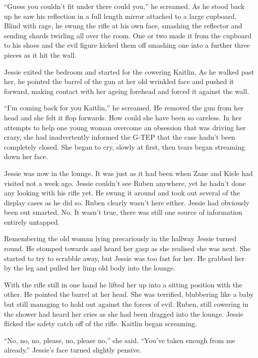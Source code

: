 ``Guess you couldn't fit under there could you,'' he screamed.  As he stood back up he saw his reflection in a full length mirror attached to a large cupboard.  Blind with rage, he swung the rifle at his own face, smashing the reflector and sending shards twirling all over the room.  One or two made it from the cupboard to his shoes and the evil figure kicked them off smashing one into a further three pieces as it hit the wall.

Jessie exited the bedroom and started for the cowering Kaitlin.  As he walked past her, he pointed the barrel of the gun at her old wrinkled face and pushed it forward, making contact with her ageing forehead and forced it against the wall.

``I'm coming back for you Kaitlin,'' he screamed.  He removed the gun from her head and she felt it flop forwards.  How could she have been so careless.  In her attempts to help one young woman overcome an obsession that was driving her crazy, she had inadvertently informed the G-TEP that the case hadn't been completely closed.  She began to cry, slowly at first, then tears began streaming down her face.

Jessie was now in the lounge.  It was just as it had been when Zane and Kiele had visited not a week ago.  Jessie couldn't see Ruben anywhere, yet he hadn't done any looking with his rifle yet.  He swung it around and took out several of the display cases as he did so.  Ruben clearly wasn't here either.  Jessie had obviously been out smarted.  No.  It wasn't true, there was still one source of information entirely untapped.

Remembering the old woman lying precariously in the hallway Jessie turned round.  He stomped towards and heard her gasp as she realised she was next.  She started to try to scrabble away, but Jessie was too fast for her.  He grabbed her by the leg and pulled her limp old body into the lounge.

With the rifle still in one hand he lifted her up into a sitting position with the other.  He pointed the barrel at her head.  She was terrified, blubbering like a baby but still managing to hold out against the forces of evil.  Ruben, still cowering in the shower had heard her cries as she had been dragged into the lounge.  Jessie flicked the safety catch off of the rifle.  Kaitlin began screaming.

``No, no, no, please, no, please no,'' she said.  ``You've taken enough from me already.''  Jessie's face turned slightly pensive.  

